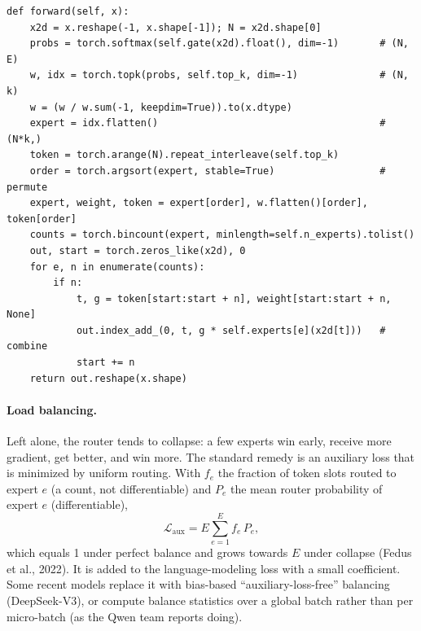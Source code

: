 \begin{lstlisting}[caption={Sort-based MoE dispatch (from \ident{llmsys/moe.py}, abridged).},label={lst:modern:moe}]
def forward(self, x):
    x2d = x.reshape(-1, x.shape[-1]); N = x2d.shape[0]
    probs = torch.softmax(self.gate(x2d).float(), dim=-1)       # (N, E)
    w, idx = torch.topk(probs, self.top_k, dim=-1)              # (N, k)
    w = (w / w.sum(-1, keepdim=True)).to(x.dtype)
    expert = idx.flatten()                                      # (N*k,)
    token = torch.arange(N).repeat_interleave(self.top_k)
    order = torch.argsort(expert, stable=True)                  # permute
    expert, weight, token = expert[order], w.flatten()[order], token[order]
    counts = torch.bincount(expert, minlength=self.n_experts).tolist()
    out, start = torch.zeros_like(x2d), 0
    for e, n in enumerate(counts):
        if n:
            t, g = token[start:start + n], weight[start:start + n, None]
            out.index_add_(0, t, g * self.experts[e](x2d[t]))   # combine
            start += n
    return out.reshape(x.shape)
\end{lstlisting}

\paragraph{Load balancing.}
Left alone, the router tends to collapse: a few experts win early, receive more gradient, get better,
and win more. The standard remedy is an auxiliary loss that is minimized by uniform routing. With $f_e$
the fraction of token slots routed to expert $e$ (a count, not differentiable) and $P_e$ the mean router
probability of expert $e$ (differentiable),
\begin{equation}
\mathcal L_\text{aux} = E\sum_{e=1}^{E} f_e\,P_e ,
\label{eq:modern:aux}
\end{equation}
which equals 1 under perfect balance and grows towards $E$ under collapse (Fedus et al., 2022). It is
added to the language-modeling loss with a small coefficient. Some recent models replace it with
bias-based ``auxiliary-loss-free'' balancing (DeepSeek-V3), or compute balance statistics over a global
batch rather than per micro-batch (as the Qwen team reports doing).

